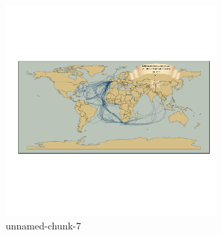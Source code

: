 \documentclass[]{article}
\let\Oldincludegraphics\includegraphics
\renewcommand{\includegraphics}[1]{\Oldincludegraphics[width=8cm]{#1}}
\begin{document}
\begin{figure}[htbp]
\centering
\includegraphics{figure/unnamed-chunk-7.png}
\caption{unnamed-chunk-7}
\end{figure}
\end{document}
